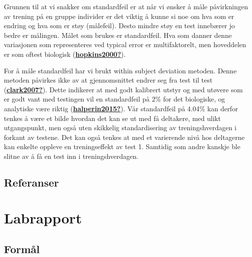 \documentclass[
]{book}
\begin{document}
Grunnen til at vi snakker om standardfeil er at når vi ønsker å måle
påvirkningen av trening på en gruppe individer er det viktig å kunne si
noe om hva som er endring og hva som er støy (målefeil). Desto mindre
støy en test innebærer jo bedre er målingen. Målet som brukes er
standardfeil. Hva som danner denne variasjonen som representeres ved
typical error er multifaktorelt, men hoveddelen er som oftest biologisk
(\protect\hyperlink{ref-hopkins2000}{\textbf{hopkins2000?}}).

For å måle standardfeil har vi brukt within subject deviation metoden.
Denne metoden påvirkes ikke av at gjennomsnittet endrer seg fra test til
test (\protect\hyperlink{ref-clark2007}{\textbf{clark2007?}}). Dette
indikerer at med godt kalibrert utstyr og med utøvere som er godt vant
med testingen vil en standardfeil på 2\% for det biologiske, og
analytiske være riktig
(\protect\hyperlink{ref-halperin2015}{\textbf{halperin2015?}}). Vår
standardfeil på 4.04\% kan derfor tenkes å være et bilde hvordan det kan
se ut med få deltakere, med ulikt utgangspunkt, men også uten skikkelig
standardisering av treningshverdagen i forkant av testene. Det kan også
tenkes at med et varierende nivå hos deltagerne kan enkelte oppleve en
treningseffekt av test 1. Samtidig som andre kanskje ble slitne av å få
en test inn i treningshverdagen.

\hypertarget{referanser}{%
\section{Referanser}\label{referanser}}

\hypertarget{labrapport}{%
\chapter{Labrapport}\label{labrapport}}

\hypertarget{formuxe5l}{%
\section{Formål}\label{formuxe5l}}

\backmatter
\end{document}
